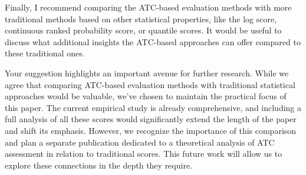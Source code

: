 \documentclass[12pt]{journalrebuttal}
\begin{document}
\begin{revcomment}
    Finally, I recommend comparing the ATC-based evaluation methods with more traditional methods based on other statistical properties, like the log score, continuous ranked probability score, or quantile scores. It would be useful to discuss what additional insights the ATC-based approaches can offer compared to these traditional ones.
\end{revcomment}
\begin{response}
Your suggestion highlights an important avenue for further research. While we agree that comparing ATC-based evaluation methods with traditional statistical approaches would be valuable, we've chosen to maintain the practical focus of this paper. The current empirical study is already comprehensive, and including a full analysis of all these scores would significantly extend the length of the paper and shift its emphasis. However, we recognize the importance of this comparison and plan a separate publication dedicated to a theoretical analysis of ATC assessment in relation to traditional scores. This future work will allow us to explore these connections in the depth they require.
\end{response}
\end{document}
